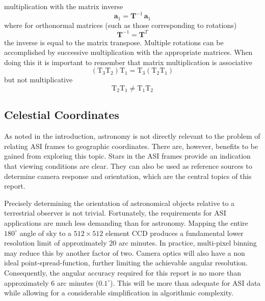 \documentclass[11pt,twoside]{article}   %
\begin{document}
multiplication with the matrix inverse
 \begin{equation}
   \mathbf{a}_1 = \mathbf{T}^{-1} \, \mathbf{a}_1
 \end{equation}
where for orthonormal matrices (such as those corresponding to
rotations)
 \begin{equation}
  \mathbf{T}^{-1} = \mathbf{T}^T
 \end{equation}
the inverse is equal to the matrix transpose.  Multiple rotations
can be accomplished by successive multiplication with the
appropriate matrices.  When doing this it is important to remember
that matrix multiplication is associative
 \begin{equation}
  \left ( \mathrm{T}_3  \mathrm{T}_2 \right ) \mathrm{T}_1 =  \mathrm{T}_3 \left ( \mathrm{T}_2
   \mathrm{T}_1  \right )
 \end{equation}
but not multiplicative
 \begin{equation}
  \mathrm{T}_2 \mathrm{T}_1 \ne \mathrm{T}_1 \mathrm{T}_2
 \end{equation}

\subsection{Celestial Coordinates}

As noted in the introduction, astronomy is not directly relevant
to the problem of relating ASI frames to geographic coordinates.
There are, however, benefits to be gained from exploring this
topic.  Stars in the ASI frames provide an indication that viewing
conditions are clear.  They can also be used as reference sources
to determine camera response and orientation, which are the
central topics of this report.

Precisely determining the orientation of astronomical objects
relative to a terrestrial observer is not trivial.  Fortunately,
the requirements for ASI applications are much less demanding than
for astronomy.  Mapping the entire $180^\circ$ angle of sky to a
$512\times 512$ element CCD produces a fundamental lower
resolution limit of approximately 20 arc minutes.  In practice,
multi-pixel binning may reduce this by another factor of two.
Camera optics will also have a non ideal point-spread-function,
further limiting the achievable angular resolution.  Consequently,
the angular accuracy required for this report is no more than
approximately 6 arc minutes ($0.1^\circ$).  This will be more than
adequate for ASI data while allowing for a considerable
simplification in algorithmic complexity.
\end{document}
